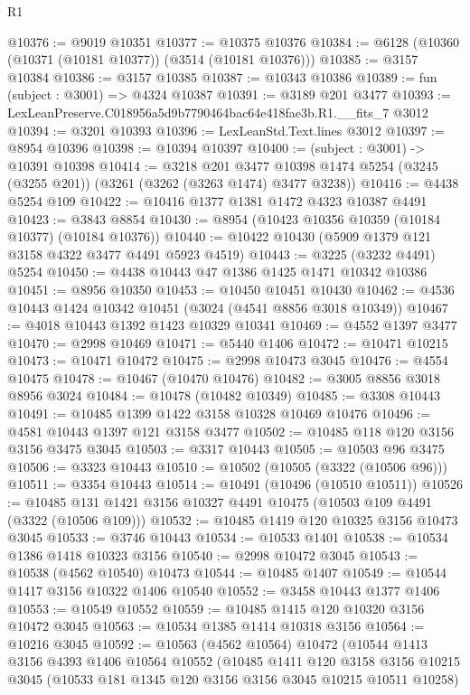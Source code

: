 \begin{lexlean}{R1}
\begin{coremodule}
@10376 := @9019 @10351
@10377 := @10375 @10376
@10384 := @6128 (@10360 (@10371 (@10181 @10377)) (@3514 (@10181 @10376)))
@10385 := @3157 @10384
@10386 := @3157 @10385
@10387 := @10343 @10386
@10389 := fun (subject : @3001) => @4324 @10387
@10391 := @3189 @201 @3477
@10393 := LexLeanPreserve.C018956a5d9b7790464bac64e418fae3b.R1.__fits_7 @3012
@10394 := @3201 @10393
@10396 := LexLeanStd.Text.lines @3012
@10397 := @8954 @10396
@10398 := @10394 @10397
@10400 := (subject : @3001) -> @10391 @10398
@10414 := @3218
    @201
    @3477
    @10398
    @1474
    @5254
    (@3245 (@3255 @201))
    (@3261 (@3262 (@3263 @1474) @3477 @3238))
@10416 := @4438 @5254 @109
@10422 := @10416 @1377 @1381 @1472 @4323 @10387 @4491
@10423 := @3843 @8854
@10430 := @8954 (@10423 @10356 @10359 (@10184 @10377) (@10184 @10376))
@10440 := @10422 @10430 (@5909 @1379 @121 @3158 @4322 @3477 @4491 @5923 @4519)
@10443 := @3225 (@3232 @4491) @5254
@10450 := @4438 @10443 @47 @1386 @1425 @1471 @10342 @10386
@10451 := @8956 @10350
@10453 := @10450 @10451 @10430
@10462 := @4536 @10443 @1424 @10342 @10451 (@3024 (@4541 @8856 @3018 @10349))
@10467 := @4018 @10443 @1392 @1423 @10329 @10341
@10469 := @4552 @1397 @3477
@10470 := @2998 @10469
@10471 := @5440 @1406
@10472 := @10471 @10215
@10473 := @10471 @10472
@10475 := @2998 @10473 @3045
@10476 := @4554 @10475
@10478 := @10467 (@10470 @10476)
@10482 := @3005 @8856 @3018 @8956 @3024
@10484 := @10478 (@10482 @10349)
@10485 := @3308 @10443
@10491 := @10485 @1399 @1422 @3158 @10328 @10469 @10476
@10496 := @4581 @10443 @1397 @121 @3158 @3477
@10502 := @10485 @118 @120 @3156 @3156 @3475 @3045
@10503 := @3317 @10443
@10505 := @10503 @96 @3475
@10506 := @3323 @10443
@10510 := @10502 (@10505 (@3322 (@10506 @96)))
@10511 := @3354 @10443
@10514 := @10491 (@10496 (@10510 @10511))
@10526 := @10485 @131 @1421 @3156 @10327 @4491 @10475 (@10503 @109 @4491 (@3322 (@10506 @109)))
@10532 := @10485 @1419 @120 @10325 @3156 @10473 @3045
@10533 := @3746 @10443
@10534 := @10533 @1401
@10538 := @10534 @1386 @1418 @10323 @3156
@10540 := @2998 @10472 @3045
@10543 := @10538 (@4562 @10540) @10473
@10544 := @10485 @1407
@10549 := @10544 @1417 @3156 @10322 @1406 @10540
@10552 := @3458 @10443 @1377 @1406
@10553 := @10549 @10552
@10559 := @10485 @1415 @120 @10320 @3156 @10472 @3045
@10563 := @10534 @1385 @1414 @10318 @3156
@10564 := @10216 @3045
@10592 := @10563
    (@4562 @10564)
    @10472
    (@10544
      @1413
      @3156
      @4393
      @1406
      @10564
      @10552
      (@10485
        @1411
        @120
        @3158
        @3156
        @10215
        @3045
        (@10533 @181 @1345 @120 @3156 @3156 @3045 @10215 @10511 @10258)

\end{coremodule}
\end{lexlean}
